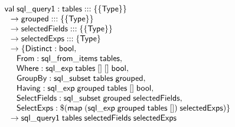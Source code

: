 \documentclass{article}
\newcommand{\mt}[1]{\mathsf{#1}}
\begin{document}
$$\begin{array}{l}
  \mt{val} \; \mt{sql\_query1} : \mt{tables} ::: \{\{\mt{Type}\}\} \\
  \hspace{.1in} \to \mt{grouped} ::: \{\{\mt{Type}\}\} \\
  \hspace{.1in} \to \mt{selectedFields} ::: \{\{\mt{Type}\}\} \\
  \hspace{.1in} \to \mt{selectedExps} ::: \{\mt{Type}\} \\
  \hspace{.1in} \to \{\mt{Distinct} : \mt{bool}, \\
  \hspace{.2in} \mt{From} : \mt{sql\_from\_items} \; \mt{tables}, \\
  \hspace{.2in} \mt{Where} : \mt{sql\_exp} \; \mt{tables} \; [] \; [] \; \mt{bool}, \\
  \hspace{.2in} \mt{GroupBy} : \mt{sql\_subset} \; \mt{tables} \; \mt{grouped}, \\
  \hspace{.2in} \mt{Having} : \mt{sql\_exp} \; \mt{grouped} \; \mt{tables} \; [] \; \mt{bool}, \\
  \hspace{.2in} \mt{SelectFields} : \mt{sql\_subset} \; \mt{grouped} \; \mt{selectedFields}, \\
  \hspace{.2in} \mt {SelectExps} : \$(\mt{map} \; (\mt{sql\_exp} \; \mt{grouped} \; \mt{tables} \; []) \; \mt{selectedExps}) \} \\
  \hspace{.1in} \to \mt{sql\_query1} \; \mt{tables} \; \mt{selectedFields} \; \mt{selectedExps}
\end{array}$$
\end{document}
